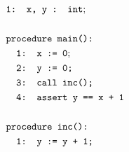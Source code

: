 \documentclass{article}
\begin{document}
	\begin{minipage}{.3\textwidth}
		\centering
		\begin{align*}
		&\texttt{1: x, y : int}; \\ \\
		&\texttt{procedure main():} \\
		&\texttt{\hspace*{1em}1:  x := 0}; \\
		&\texttt{\hspace*{1em}2:  y := 0;} \\
		&\texttt{\hspace*{1em}3: call inc();} \\
		&\texttt{\hspace*{1em}4: assert y == x + 1} \\ \\
		&\texttt{procedure inc():} \\
		&\texttt{\hspace*{1em}1: y := y\ +\ 1;} \\
		\end{align*}
		
		\label{fig:square}
	\end{minipage}%
	\hfill
\end{document}

